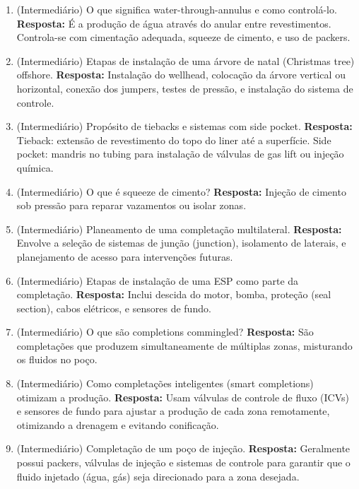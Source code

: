 \documentclass[11pt,a4paper]{article}
\begin{document}
\begin{enumerate}
  \item (Intermediário) O que significa water-through-annulus e como controlá-lo.
  \textbf{Resposta:} É a produção de água através do anular entre revestimentos. Controla-se com cimentação adequada, squeeze de cimento, e uso de packers.

  \item (Intermediário) Etapas de instalação de uma árvore de natal (Christmas tree) offshore.
  \textbf{Resposta:} Instalação do wellhead, colocação da árvore vertical ou horizontal, conexão dos jumpers, testes de pressão, e instalação do sistema de controle.

  \item (Intermediário) Propósito de tiebacks e sistemas com side pocket.
  \textbf{Resposta:} Tieback: extensão de revestimento do topo do liner até a superfície. Side pocket: mandris no tubing para instalação de válvulas de gas lift ou injeção química.

  \item (Intermediário) O que é squeeze de cimento?
  \textbf{Resposta:} Injeção de cimento sob pressão para reparar vazamentos ou isolar zonas.

  \item (Intermediário) Planeamento de uma completação multilateral.
  \textbf{Resposta:} Envolve a seleção de sistemas de junção (junction), isolamento de laterais, e planejamento de acesso para intervenções futuras.

  \item (Intermediário) Etapas de instalação de uma ESP como parte da completação.
  \textbf{Resposta:} Inclui descida do motor, bomba, proteção (seal section), cabos elétricos, e sensores de fundo.

  \item (Intermediário) O que são completions commingled?
  \textbf{Resposta:} São completações que produzem simultaneamente de múltiplas zonas, misturando os fluidos no poço.

  \item (Intermediário) Como completações inteligentes (smart completions) otimizam a produção.
  \textbf{Resposta:} Usam válvulas de controle de fluxo (ICVs) e sensores de fundo para ajustar a produção de cada zona remotamente, otimizando a drenagem e evitando conificação.

  \item (Intermediário) Completação de um poço de injeção.
  \textbf{Resposta:} Geralmente possui packers, válvulas de injeção e sistemas de controle para garantir que o fluido injetado (água, gás) seja direcionado para a zona desejada.


\end{enumerate}
\end{document}
